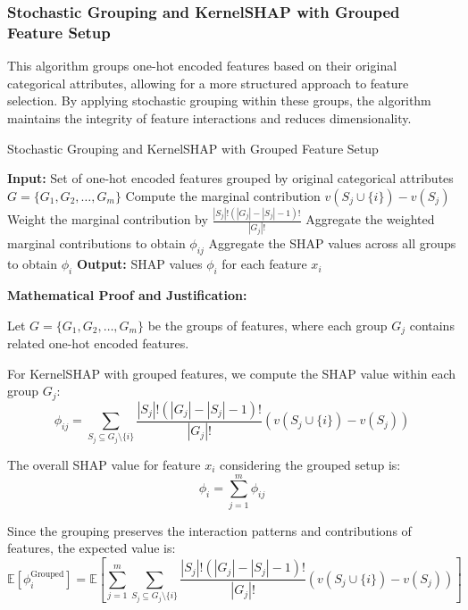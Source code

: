 \subsubsection{Stochastic Grouping and KernelSHAP with Grouped Feature Setup}

This algorithm groups one-hot encoded features based on their original categorical attributes, allowing for a more structured approach to feature selection. By applying stochastic grouping within these groups, the algorithm maintains the integrity of feature interactions and reduces dimensionality.

\begin{algorithm}[H]
\caption{Stochastic Grouping and KernelSHAP with Grouped Feature Setup}
\label{algo:group}
\begin{algorithmic}[1]
\State \textbf{Input:} Set of one-hot encoded features grouped by original categorical attributes $G = \{G_1, G_2, \ldots, G_m\}$
            \State Compute the marginal contribution $v(S_j \cup \{i\}) - v(S_j)$
            \State Weight the marginal contribution by $\frac{|S_j|!(|G_j| - |S_j| - 1)!}{|G_j|!}$
        \EndFor
        \State Aggregate the weighted marginal contributions to obtain $\phi_{ij}$
    \EndFor
\EndFor
\State Aggregate the SHAP values across all groups to obtain $\phi_i$
\State \textbf{Output:} SHAP values $\phi_i$ for each feature $x_i$
\end{algorithmic}
\end{algorithm}

\textbf{Mathematical Proof and Justification:}

Let $G = \{G_1, G_2, \ldots, G_m\}$ be the groups of features, where each group $G_j$ contains related one-hot encoded features.

For KernelSHAP with grouped features, we compute the SHAP value within each group $G_j$:
\[ \phi_{ij} = \sum_{S_j \subseteq G_j \setminus \{i\}} \frac{|S_j|!(|G_j| - |S_j| - 1)!}{|G_j|!} (v(S_j \cup \{i\}) - v(S_j)) \]

The overall SHAP value for feature $x_i$ considering the grouped setup is:
\[ \phi_i = \sum_{j=1}^m \phi_{ij} \]

Since the grouping preserves the interaction patterns and contributions of features, the expected value is:
\[ \mathbb{E}[\phi_i^{\text{Grouped}}] = \mathbb{E} \left[ \sum_{j=1}^m \sum_{S_j \subseteq G_j \setminus \{i\}} \frac{|S_j|!(|G_j| - |S_j| - 1)!}{|G_j|!} (v(S_j \cup \{i\}) - v(S_j)) \right] \]

